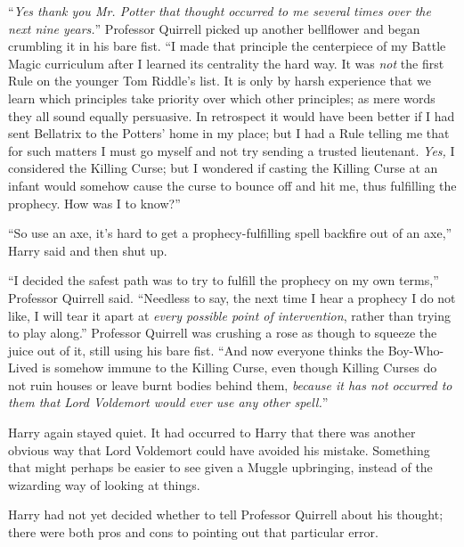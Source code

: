 ``\emph{Yes thank you Mr. Potter that thought occurred to me several times over the next nine years.}'' Professor Quirrell picked up another bellflower and began crumbling it in his bare fist. ``I made that principle the centerpiece of my Battle Magic curriculum after I learned its centrality the hard way. It was \emph{not} the first Rule on the younger Tom Riddle's list. It is only by harsh experience that we learn which principles take priority over which other principles; as mere words they all sound equally persuasive. In retrospect it would have been better if I had sent Bellatrix to the Potters' home in my place; but I had a Rule telling me that for such matters I must go myself and not try sending a trusted lieutenant. \emph{Yes,} I considered the Killing Curse; but I wondered if casting the Killing Curse at an infant would somehow cause the curse to bounce off and hit me, thus fulfilling the prophecy. How was I to know?''

``So use an axe, it's hard to get a prophecy-fulfilling spell backfire out of an axe,'' Harry said and then shut up.

``I decided the safest path was to try to fulfill the prophecy on my own terms,'' Professor Quirrell said. ``Needless to say, the next time I hear a prophecy I do not like, I will tear it apart at \emph{every possible point of intervention}, rather than trying to play along.'' Professor Quirrell was crushing a rose as though to squeeze the juice out of it, still using his bare fist. ``And now everyone thinks the Boy-Who-Lived is somehow immune to the Killing Curse, even though Killing Curses do not ruin houses or leave burnt bodies behind them, \emph{because it has not occurred to them that Lord Voldemort would ever use any other spell.}''

Harry again stayed quiet. It had occurred to Harry that there was another obvious way that Lord Voldemort could have avoided his mistake. Something that might perhaps be easier to see given a Muggle upbringing, instead of the wizarding way of looking at things.

Harry had not yet decided whether to tell Professor Quirrell about his thought; there were both pros and cons to pointing out that particular error.

